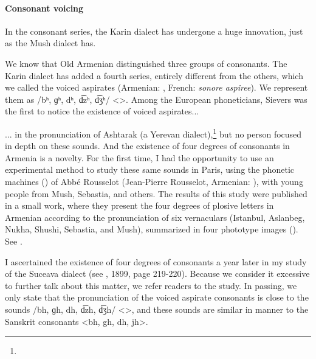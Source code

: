 \paragraph{Consonant voicing}

In the consonant series, the Karin dialect has undergone a huge innovation, just as the Mush dialect has. 

We know that Old Armenian distinguished three groups of consonants. The Karin dialect has added a fourth series, entirely different from the others, which we called the voiced aspirates (Armenian: \textit{}, French: \textit{sonore aspiree}). We represent them as /bʰ, ɡʰ, dʰ, d͡zʰ, d͡ʒʰ/ <>. Among the European phoneticians, Sievers was the first to notice the existence of voiced aspirates... 



\begin{adjarianpage}\label{page:106}\end{adjarianpage}%

... in the pronunciation of Ashtarak (a Yerevan dialect),\footnote{} but no person focused in depth on these sounds. And the existence of four degrees of consonants in Armenia is a novelty. For the first time, I had the opportunity to use an experimental method to study these same sounds in Paris, using the phonetic machines () of Abbé Rousselot (Jean-Pierre Rousselot, Armenian: ), with young people from Mush, Sebastia, and others. The results of this study were published in a small work, where they present the four degrees of plosive letters in Armenian according to the pronunciation of six vernaculars (Istanbul, Aslanbeg, Nukha, Shushi, Sebastia, and Mush), summarized in four phototype images (). See \citet{Adjarian-1899-ArmenianExplosives}. 

I ascertained the existence of four degrees of consonants a year later in my study of the Suceava dialect (see , 1899, page 219-220). Because we consider it excessive to further talk about this matter, we refer readers to the study. In passing, we only state that the pronunciation of the voiced aspirate consonants is close to the sounds /bh, ɡh, dh, d͡zh, d͡ʒh/ <>, and these sounds are similar in manner to the Sanskrit consonants <bh, gh, dh, jh>. 


